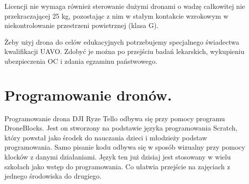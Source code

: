 \documentclass{article}
\begin{document}
Licencji nie wymaga również sterowanie dużymi dronami o wadzę całkowitej nie przekraczającej 25 kg, pozostając z nim w stałym kontakcie wzrokowym w niekontrolowanie przestrzeni powietrznej (klasa G).

Żeby użyj drona do celów edukacyjnych potrzebujemy specjalnego świadectwa kwalifikacji UAVO. Zdobyć je można po przejściu badań lekarskich, wykupieniu ubezpieczenia OC i zdania egzaminu państwowego. 

\section{Programowanie dronów.}
Programowanie drona DJI Ryze Tello odbywa się przy pomocy programu DroneBlocks. Jest on stworzony na podstawie języka programowania Scratch, który powstał jako środek do nauczania dzieci i młodzieży podstaw programowania. Samo pisanie kodu odbywa się w sposób wizualny przy pomocy klocków z danymi działaniami. Język ten już dzisiaj jest stosowany w wielu szkołach jako wstęp do programowania.  Co ułatwia przejście na zajęciach z jednego środowiska do drugiego.
\end{document}

